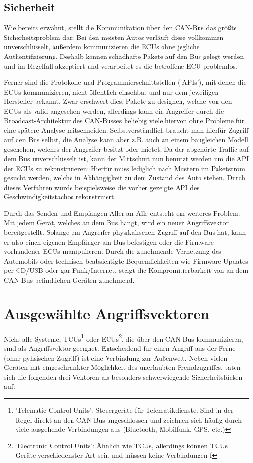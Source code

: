 \documentclass[
    fontsize=12pt,
    headings=small,
    parskip=half,           %
    bibliography=totoc,9
    numbers=noenddot,       %
    open=any,               %
    ]{scrreprt}
\begin{document}
\subsection{Sicherheit}
Wie bereits erwähnt, stellt die Kommunikation über den CAN-Bus das größte Sicherheitsproblem dar: Bei den meisten Autos verläuft diese vollkommen unverschlüsselt, außerdem kommunizieren die ECUs ohne jegliche Authentifizierung. Deshalb können schadhafte Pakete auf den Bus gelegt werden und im Regelfall akzeptiert und verarbeitet es die betroffene ECU problemlos.\par
Ferner sind die Protokolle und Programmierschnittstellen ('APIs'), mit denen die ECUs kommunizieren, nicht öffentlich einsehbar und nur dem jeweiligen Hersteller bekannt. Zwar erschwert dies, Pakete zu designen, welche von den ECUs als valid angesehen werden, allerdings kann ein Angreifer durch die Broadcast-Architektur des CAN-Busses beliebig viele hiervon ohne Probleme für eine spätere Analyse mitschneiden.
Selbstverständlich braucht man hierfür Zugriff auf den Bus selbst, die Analyse kann aber z.B. auch an einem baugleichen Modell geschehen, welches der Angreifer besitzt oder mietet. Da der abgehörte Traffic auf dem Bus unverschlüsselt ist, kann der Mittschnit nun benutzt werden um die API der ECUs zu rekonstruieren: Hierfür muss lediglich nach Mustern im Paketstrom gesucht werden, welche in Abhängigkeit zu dem Zustand des Auto stehen. Durch dieses Verfahren wurde beispielsweise die vorher gezeigte API des Geschwindigkeitstachos rekonstruiert.

Durch das Senden und Empfangen Aller an Alle entsteht ein weiteres Problem. Mit jedem Gerät, welches an dem Bus hängt, wird ein neuer Angriffsvektor bereitgestellt.
Solange ein Angreifer physikalischen Zugriff auf den Bus hat, kann er also einen eigenen Empfänger am Bus befestigen oder die Firmware vorhandener ECUs manipulieren.
Durch die zunehmende Vernetzung des Automobils oder technisch beabsichtigte Bequemlichkeiten wie Firmware-Updates per CD/USB oder gar Funk/Internet, steigt die Kompromitierbarkeit von an dem CAN-Bus befindlichen Geräten zunehmend.


\section{Ausgewählte Angriffsvektoren}
Nicht alle Systeme, TCUs\footnote{'Telematic Control Units': Steuergeräte für Telematikdienste. Sind in der Regel direkt an den CAN-Bus angeschlossen und zeichnen sich häufig durch viele ausgehende Verbindungen aus (Bluetooth, Mobilfunk, GPS, etc.)} oder ECUs\footnote{'Electronic Control Units': Ähnlich wie TCUs, allerdings können TCUs Geräte verschiedenster Art sein und müssen keine Verbindungen f}, die über den CAN-Bus kommunizieren, sind als Angriffsvektor geeignet. Entscheidend für einen Angriff aus der Ferne (ohne pyhsischen Zugriff) ist eine Verbindung zur Außenwelt. Neben vielen Geräten mit eingeschränkter Möglichkeit des unerlaubten Fremdzugriffes, taten sich die folgenden drei Vektoren als besonders schwerwiegende Sicherheitslücken auf:
\end{document}
